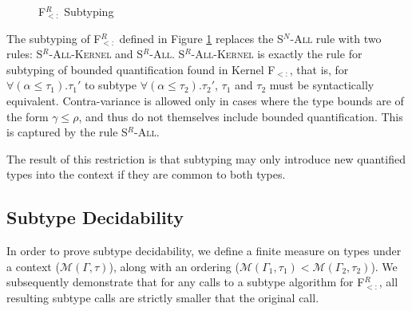 \documentclass[runningheads, anon]{llncs}
\begin{document}
\begin{figure}[t]
\caption{F$_{<:}^R$ Subtyping}
\label{f:sep:subtyping}
\end{figure}

The subtyping of F$_{<:}^R$ defined in Figure \ref{f:sep:subtyping} replaces the \textsc{S$^N$-All} rule with two rules: \textsc{S$^R$-All-Kernel} and \textsc{S$^R$-All}. 
\textsc{S$^R$-All-Kernel} is exactly the rule for subtyping of bounded quantification found in Kernel F$_{<:}$, that is, 
for $\forall(\alpha \leqslant \tau_1).\tau_1'$ to subtype $\forall(\alpha \leqslant \tau_2).\tau_2'$, $\tau_1$ and $\tau_2$ must be syntactically equivalent.
Contra-variance is allowed only in cases where the type bounds are of the form $\gamma \leqslant \rho$, and thus do not themselves include bounded quantification.
This is captured by the rule \textsc{S$^R$-All}.

The result of this restriction is that subtyping may only introduce new quantified types into the context if they are common to both types.

\subsection{Subtype Decidability}

In order to prove subtype decidability, we define a finite measure on types under a context ($\mathcal{M}(\Gamma, \tau)$), along 
with an ordering ($\mathcal{M}(\Gamma_1, \tau_1) < \mathcal{M}(\Gamma_2, \tau_2)$). 
We subsequently demonstrate that for any calls to a subtype algorithm for F$_{<:}^R$, all resulting subtype calls are strictly 
smaller that the original call.
\end{document}
